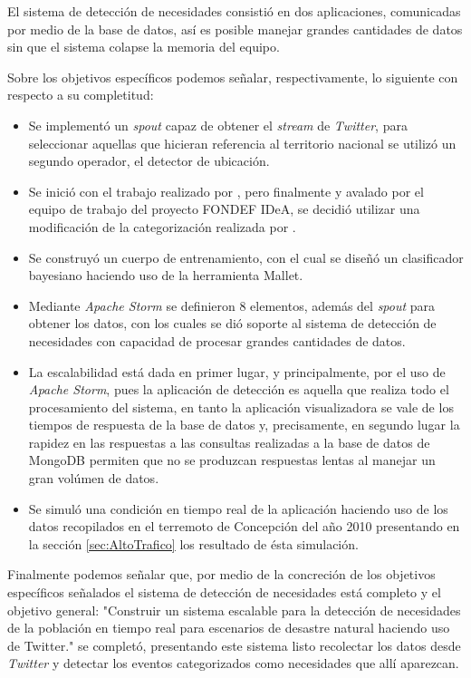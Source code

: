 El sistema de detección de necesidades consistió en dos aplicaciones, comunicadas por medio de la base de datos, así es posible manejar grandes cantidades de datos sin que el sistema colapse la memoria del equipo.

Sobre los objetivos específicos podemos señalar, respectivamente, lo siguiente con respecto a su completitud:

\begin{itemize}
\item Se implementó un \textit{spout} capaz de obtener el \textit{stream} de \textit{Twitter}, para seleccionar aquellas que hicieran referencia al territorio nacional se utilizó un segundo operador, el detector de ubicación.
\item Se inició con el trabajo realizado por \cite{TaxonomiaChato}, pero finalmente y avalado por el equipo de trabajo del proyecto FONDEF IDeA, se decidió utilizar una modificación de la categorización realizada por \cite{PMIProfes}.
\item Se construyó un cuerpo de entrenamiento, con el cual se diseñó un clasificador bayesiano haciendo uso de la herramienta Mallet.
\item Mediante \textit{Apache Storm} se definieron 8 elementos, además del \textit{spout} para obtener los datos, con los cuales se dió soporte al sistema de detección de necesidades con capacidad de procesar grandes cantidades de datos.
\item La escalabilidad está dada en primer lugar, y principalmente, por el uso de \textit{Apache Storm}, pues la aplicación de detección es aquella que realiza todo el procesamiento del sistema, en tanto la aplicación visualizadora se vale de los tiempos de respuesta de la base de datos y, precisamente, en segundo lugar la rapidez en las respuestas a las consultas realizadas a la base de datos de MongoDB permiten que no se produzcan respuestas lentas al manejar un gran volúmen de datos.
\item Se simuló una condición en tiempo real de la aplicación haciendo uso de los datos recopilados en el terremoto de Concepción del año 2010 presentando en la sección \ref{sec:AltoTrafico} los resultado de ésta simulación.
\end{itemize}

Finalmente podemos señalar que, por medio de la concreción de los objetivos específicos señalados el sistema de detección de necesidades está completo y el objetivo general: "Construir un sistema escalable para la detección de necesidades de la población en tiempo real para escenarios de desastre natural haciendo uso de Twitter." se completó, presentando este sistema listo recolectar los datos desde \textit{Twitter} y detectar los eventos categorizados como necesidades que allí aparezcan.

